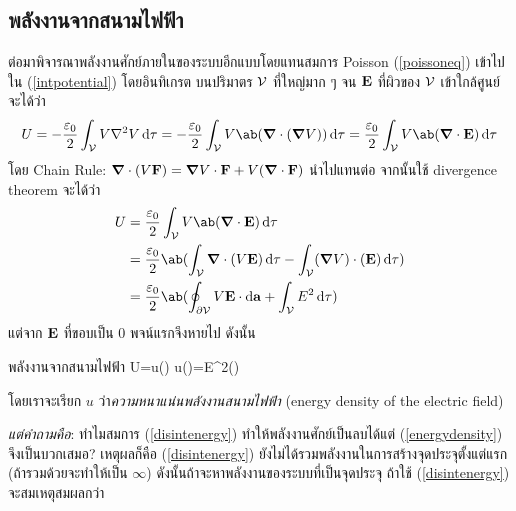 \subsection{พลังงานจากสนามไฟฟ้า}
ต่อมาพิจารณาพลังงานศักย์ภายในของระบบอีกแบบโดยแทนสมการ Poisson (\ref{poissoneq}) เข้าไปใน (\ref{intpotential}) โดยอินทิเกรต บนปริมาตร $\mathcal{V}$ ที่ใหญ่มาก ๆ จน $\mathbf{E}$ ที่ผิวของ $\mathcal{V}$ เข้าใกล้ศูนย์ จะได้ว่า
\[
U=-\frac{\eps_0}{2}\int_\vol V\nabla^2 V\odif{\tau}=-\frac{\eps_0}{2}\int_\vol V\ab(\gd\cdot(\gd V))\odif{\tau}=\frac{\eps_0}{2}\int_\vol V\ab(\gd\cdot\vb{E})\odif{\tau}
\]
โดย Chain Rule: $\boldsymbol{\nabla}\cdot( V\mathbf{F})=\boldsymbol{\nabla} V\cdot\mathbf{F}+ V(\boldsymbol{\nabla}\cdot\mathbf{F})$ นำไปแทนต่อ จากนั้นใช้ divergence theorem จะได้ว่า
\begin{align*}
    U&=\frac{\eps_0}{2}\int_\vol V\ab(\gd\cdot\vb{E})\odif{\tau}\\
    &=\frac{\eps_0}{2}\ab(\int_\vol\gd\cdot( V\vb{E})\odif{\tau}-\int_\vol(\gd V)\cdot(\vb{E})\odif{\tau})\\
    &=\frac{\eps_0}{2}\ab(\oint_{\del\vol} V\vb{E}\cdot\odif{\vb{a}}+\int_\vol E^2\odif{\tau})
\end{align*}
แต่จาก $\mathbf{E}$ ที่ขอบเป็น $0$ พจน์แรกจึงหายไป ดังนั้น
\begin{ieqbox}{พลังงานจากสนามไฟฟ้า}
    U=\int u()\odif{\tau} u()=E^2()\label{energydensity}
\end{ieqbox}
โดยเราจะเรียก $u$ ว่า\emph{ความหนาแน่นพลังงานสนามไฟฟ้า} (energy density of the electric field)

\emph{แต่คำถามคือ}: ทำไมสมการ (\ref{disintenergy}) ทำให้พลังงานศักย์เป็นลบได้แต่ (\ref{energydensity}) จึงเป็นบวกเสมอ? เหตุผลก็คือ (\ref{disintenergy}) ยังไม่ได้รวมพลังงานในการสร้างจุดประจุตั้งแต่แรก (ถ้ารวมด้วยจะทำให้เป็น $\infty$) ดังนั้นถ้าจะหาพลังงานของระบบที่เป็นจุดประจุ ถ้าใช้ (\ref{disintenergy}) จะสมเหตุสมผลกว่า

